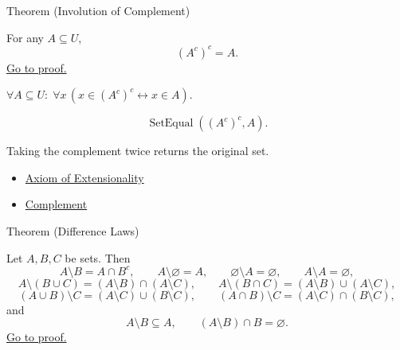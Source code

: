 \begin{theorembox}{Theorem (Involution of Complement)}
\begin{theorem}\label{thm:involution}
For any $A \subseteq U$,
\[
(A^c)^c = A.
\]
\hyperref[prf:involution]{Go to proof.}
\end{theorem}
\end{theorembox}

\begin{remark*}
$\forall A \subseteq U:\; \forall x\,(x \in (A^c)^c \leftrightarrow x \in A)$.
\end{remark*}

\begin{remark*}
\[
  \operatorname{SetEqual}((A^c)^c,A).
\]
\end{remark*}

\begin{remark*}[Interpretation]
Taking the complement twice returns the original set.
\end{remark*}


\begin{dependencies}
\begin{itemize}
  \item \hyperref[ax:extensionality]{Axiom of Extensionality}
  \item \hyperref[def:complement]{Complement}
\end{itemize}
\end{dependencies}

\begin{theorembox}{Theorem (Difference Laws)}
\begin{theorem}\label{thm:difference-laws}
Let $A,B,C$ be sets. Then
\[
A\setminus B=A\cap B^c,
\qquad
A\setminus\varnothing=A,
\qquad
\varnothing\setminus A=\varnothing,
\qquad
A\setminus A=\varnothing,
\]
\[
A\setminus(B\cup C)=(A\setminus B)\cap(A\setminus C),
\qquad
A\setminus(B\cap C)=(A\setminus B)\cup(A\setminus C),
\]
\[
(A\cup B)\setminus C=(A\setminus C)\cup(B\setminus C),
\qquad
(A\cap B)\setminus C=(A\setminus C)\cap(B\setminus C),
\]
and
\[
A\setminus B\subseteq A,
\qquad
(A\setminus B)\cap B=\varnothing.
\]
\hyperref[prf:difference-laws]{Go to proof.}
\end{theorem}
\end{theorembox}


